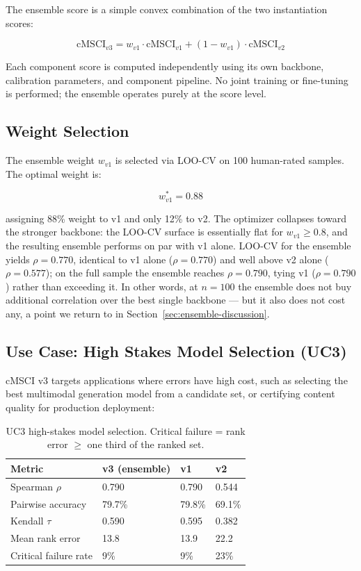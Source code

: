 The ensemble score is a simple convex combination of the two instantiation scores:

\begin{equation}\label{eq:v3-ensemble}
\mathrm{cMSCI}_{v3} = w_{v1} \cdot \mathrm{cMSCI}_{v1} + (1 - w_{v1}) \cdot \mathrm{cMSCI}_{v2}
\end{equation}

Each component score is computed independently using its own backbone, calibration parameters, and component pipeline. No joint training or fine-tuning is performed; the ensemble operates purely at the score level.

\subsection{Weight Selection}\label{sec:v3-weight}

The ensemble weight $w_{v1}$ is selected via LOO-CV on 100 human-rated samples. The optimal weight is:

\begin{equation}\label{eq:v3-weight-opt}
w_{v1}^{*} = 0.88
\end{equation}

assigning 88\% weight to v1 and only 12\% to v2. The optimizer collapses toward the stronger backbone: the LOO-CV surface is essentially flat for $w_{v1} \geq 0.8$, and the resulting ensemble performs on par with v1 alone. LOO-CV for the ensemble yields $\rho = 0.770$, identical to v1 alone ($\rho = 0.770$) and well above v2 alone ($\rho = 0.577$); on the full sample the ensemble reaches $\rho = 0.790$, tying v1 ($\rho = 0.790$) rather than exceeding it. In other words, at $n = 100$ the ensemble does not buy additional correlation over the best single backbone — but it also does not cost any, a point we return to in Section~\ref{sec:ensemble-discussion}.

\subsection{Use Case: High Stakes Model Selection (UC3)}\label{sec:uc3}

cMSCI v3 targets applications where errors have high cost, such as selecting the best multimodal generation model from a candidate set, or certifying content quality for production deployment:

\begin{table}[t]
\caption{UC3 high-stakes model selection. Critical failure = rank error $\geq$ one third of the ranked set.}\label{tab:uc3}
\centering
\begin{tabular}{llll}
\toprule
Metric & v3 (ensemble) & v1 & v2 \\
\midrule
Spearman $\rho$ & 0.790 & 0.790 & 0.544 \\
Pairwise accuracy & 79.7\% & 79.8\% & 69.1\% \\
Kendall $\tau$ & 0.590 & 0.595 & 0.382 \\
Mean rank error & 13.8 & 13.9 & 22.2 \\
Critical failure rate & 9\% & 9\% & 23\% \\
\bottomrule
\end{tabular}
\end{table}

